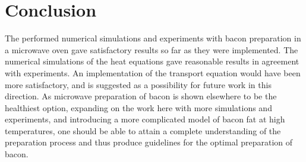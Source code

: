 \section{Conclusion}
The performed numerical simulations and experiments with bacon preparation
in a microwave oven gave satisfactory results so far as they were implemented.
The numerical simulations of the heat equations gave reasonable results in agreement
with experiments. An implementation of the transport equation would have been
more satisfactory, and is suggested as a possibility for future work in this
direction. As microwave preparation of bacon is shown elsewhere to be the
healthiest option, expanding on the work here with more simulations and
experiments, and introducing a more complicated model of bacon fat at high
temperatures, one should be able to attain a complete understanding of the
preparation process and thus produce guidelines for the optimal preparation of
bacon.

